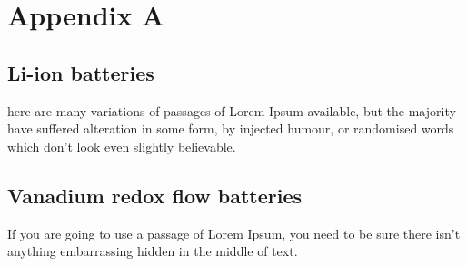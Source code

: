 \documentclass[../main.tex]{subfiles}
\begin{document}
 
\chapter{Appendix A}
\section{Li-ion batteries}
 here are many variations of passages of Lorem Ipsum available, but the majority have suffered alteration in some form, by injected humour, or randomised words which don't look even slightly believable. 
 
\section{Vanadium redox flow batteries}
  If you are going to use a passage of Lorem Ipsum, you need to be sure there isn't anything embarrassing hidden in the middle of text.
\end{document}
